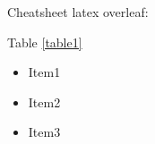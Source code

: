 Cheatsheet latex overleaf: 

\usepackage{comment}

\begin{comment}
This section is commented out and will not appear in the output.
You can include any amount of text, LaTeX commands, equations, etc., here.
\end{comment}


Table \ref{table1}




\cite{bib1}





\begin{itemize}
	\item Item1
	\item Item2
	\item Item3
\end{itemize}

